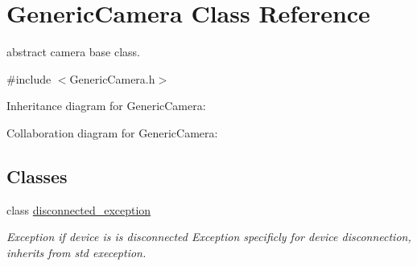 \hypertarget{class_generic_camera}{}\section{Generic\+Camera Class Reference}
\label{class_generic_camera}


abstract camera base class.  




{\ttfamily \#include $<$Generic\+Camera.\+h$>$}



Inheritance diagram for Generic\+Camera\+:


Collaboration diagram for Generic\+Camera\+:
\subsection*{Classes}
\begin{DoxyCompactItemize}
\item 
class \hyperlink{class_generic_camera_1_1disconnected__exception}{disconnected\+\_\+exception}
\begin{DoxyCompactList}\small\item\em Exception if device is is disconnected Exception specificly for device disconnection, inherits from std exeception. \end{DoxyCompactList}\end{DoxyCompactItemize}
